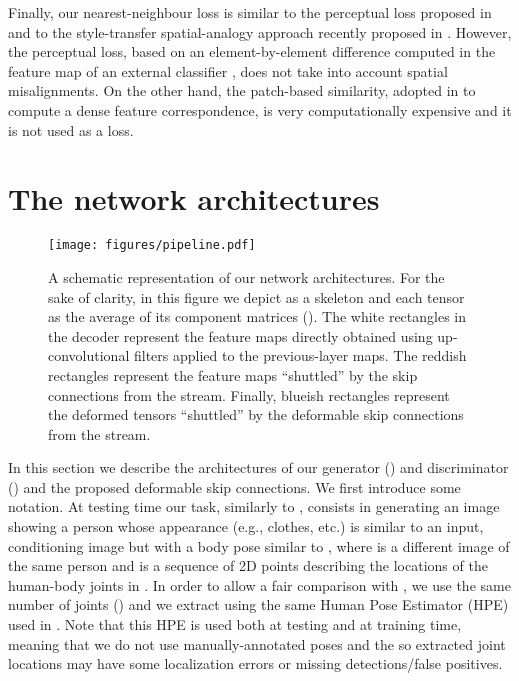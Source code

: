 \documentclass[10pt,twocolumn,letterpaper]{article}
\begin{document}
 Finally, our nearest-neighbour loss is similar to the
 perceptual loss proposed in \cite{DBLP:conf/eccv/JohnsonAF16} and to the 
  style-transfer spatial-analogy approach recently proposed in \cite{DBLP:journals/tog/LiaoYYHK17}. However, 
the perceptual loss,  based on an element-by-element difference computed in the feature map of an external classifier \cite{DBLP:conf/eccv/JohnsonAF16}, does not take into account spatial misalignments. On the other hand,   
  the patch-based similarity, adopted in \cite{DBLP:journals/tog/LiaoYYHK17} to compute a dense feature correspondence, is very computationally expensive and it is not used as a loss. 
  

 
 \section{The network architectures}
\label{architectures}

\begin{figure*}[t]\centering
\texttt{[image: figures/pipeline.pdf]}
\caption{A schematic representation of our network architectures. For the sake of clarity, in this figure we depict  as a skeleton and each tensor  as the average of its component matrices  (). The white rectangles in the decoder represent the feature maps directly obtained using up-convolutional filters applied to the previous-layer maps. The reddish rectangles represent the feature maps ``shuttled'' by the skip connections from the  stream. Finally, blueish rectangles represent the deformed tensors  ``shuttled'' by the deformable skip connections from the  stream.}
\vspace{-0.5cm}
\label{fig:pipeline}
\end{figure*}

In this section we describe the architectures of our generator () and discriminator ()  and the proposed deformable skip connections.  We first introduce  some notation. At testing time our task, similarly to \cite{ma2017pose}, consists in generating an image  showing a person whose appearance (e.g., clothes, etc.) is similar to an input, conditioning image  but with a body pose similar to , where  is a different image of the same person and  is a sequence of  2D points describing the locations of the human-body joints in . 
In order to allow  a fair comparison with \cite{ma2017pose},
we use the same number  of joints ()
and we extract   using the same Human Pose Estimator (HPE)  \cite{Cao} used in \cite{ma2017pose}. Note that this HPE is used both at testing and at training time, meaning that we do not use manually-annotated poses and the so extracted joint locations may have some localization errors or missing detections/false positives.
\end{document}
